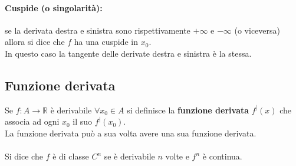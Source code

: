 \documentclass[12pt,a4paper]{article}
\begin{document}
\paragraph{Cuspide (o singolarità): } se la derivata destra e sinistra sono rispettivamente $+ \infty$ e $- \infty$ (o viceversa) allora si dice che $f$ ha una cuspide in $x_0$.\\
In questo caso la tangente delle derivate destra e sinistra è la stessa.

\subsection{Funzione derivata}
Se $f: A \rightarrow \mathbb{R}$ è derivabile $\forall x_0 \in A$ si definisce la \textbf{funzione derivata} $f^|(x)$ che associa ad ogni $x_0$ il suo $f^|(x_0)$.\\
La funzione derivata può a sua volta avere una sua funzione derivata.\\\\
Si dice che $f$ è di classe $C^n$ se è derivabile $n$ volte e $f^n$ è continua.
\end{document}
